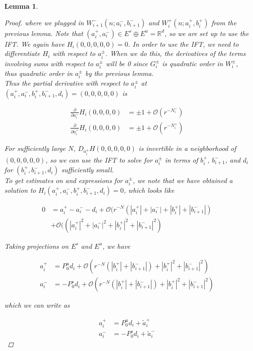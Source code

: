 \documentclass[12pt]{article}
\def\R{{\mathbb R}}
\newtheorem{lemma}{Lemma}
\begin{document}
\begin{lemma}
\begin{proof}
where we plugged in $W_{i+1}^-(n; a_i^-, b_{i+1}^-)$ and $W_i^+(n; a_i^+, b_i^+)$ from the previous lemma. Note that $(a_i^+, a_i^-) \in E^s \oplus E^u = \R^d$, so we are set up to use the IFT. We again have $H_i(0,0,0,0,0) = 0$. In order to use the IFT, we need to differentiate $H_i$ with respect to $a_i^\pm$. When we do this, the derivatives of the terms involving sums with respect to $a_i^\pm$ will be 0 since $G_i^\pm$ is quadratic order in $W_i^\pm$, thus quadratic order in $a_i^\pm$ by the previous lemma.\\

Thus the partial derivative with respect to $a_i^\pm$ at $(a_i^+, a_i^-, b_i^+, b_{i+1}^-, d_i) =(0, 0, 0, 0, 0)$ is 

\begin{align*}
\frac{\partial}{\partial a_i^-} H_i(0, 0, 0, 0) &= \pm 1 + \mathcal{O}(r^{-N_i^-}) \\
\frac{\partial}{\partial a_i^+} H_i(0, 0, 0, 0) &= \pm 1 + \mathcal{O}(r^{-N_i^+})
\end{align*}

For sufficiently large $N$, $D_{a_i^\pm} H(0, 0, 0, 0, 0)$ is invertible in a neighborhood of $(0, 0, 0, 0, 0)$, so we can use the IFT to solve for $a_i^\pm$ in terms of $b_i^+$, $b_{i+1}^-$, and $d_i$ for $(b_i^+, b_{i+1}^-, d_i)$ sufficiently small. \\

To get estimates on and expressions for $a_i^\pm$, we note that we have obtained a solution to $H_i(a_i^+, a_i^-, b_i^+, b_{i+1}^-, d_i) = 0$, which looks like 

\begin{align*}
0 &= a_i^+ - a_i^- - d_i + \mathcal{O}(r^{-N}(|a_i^+|+|a_i^-|+|b_i^+|+|b_{i+1}^-|)\\
&+ \mathcal{O}((|a_i^+|^2+|a_i^-|^2+|b_i^+|^2+|b_{i+1}^-|^2)
\end{align*}

Taking projections on $E^s$ and $E^u$, we have

\begin{align*}
a_i^+ &= P_0^u d_i + \mathcal{O}(r^{-N}(|b_i^+|+|b_{i+1}^-|) + |b_i^+|^2+|b_{i+1}^-|^2) \\
a_i^- &= -P_0^s d_i + \mathcal{O}(r^{-N}(|b_i^+|+|b_{i+1}^-|) + |b_i^+|^2+|b_{i+1}^-|^2)
\end{align*}

which we can write as

\begin{align*}
a_i^+ &= P_0^u d_i + \tilde{a}_i^+ \\
a_i^- &= -P_0^s d_i + \tilde{a}_i^-
\end{align*}


\end{proof}
\end{lemma}
\end{document}
